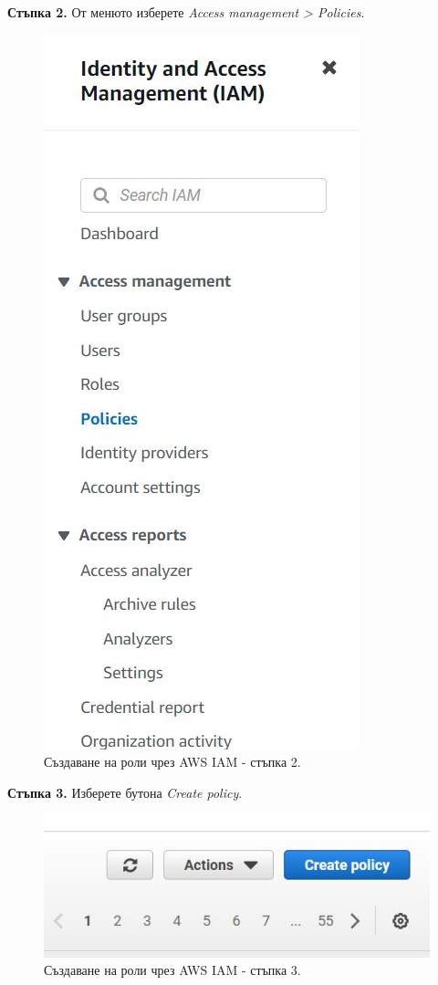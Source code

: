 \documentclass[12pt]{article}
\begin{document}
\noindent\textbf{Стъпка 2.} От менюто изберете \textit{Access management > Policies}.
\begin{figure}[h!]
\centering
    \includegraphics[scale=0.55]{instructions/iam/2.JPG}
  \caption{Създаване на роли чрез AWS IAM - стъпка 2.}
\end{figure}

\noindent\textbf{Стъпка 3.} Изберете бутона \textit{Create policy}.
\begin{figure}[h!]
\centering
    \includegraphics[scale=0.7]{instructions/iam/3.JPG}
  \caption{Създаване на роли чрез AWS IAM - стъпка 3.}
\end{figure}
\end{document}
